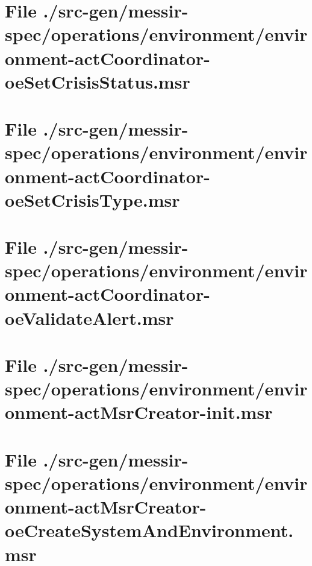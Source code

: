\section[File /src-gen/messir-spec.../environment-actCoordinator-oeSetCrisisStatus.msr]{File ./src-gen/messir-spec/operations/environment/environment-actCoordinator-oeSetCrisisStatus.msr}
\scriptsize

\normalsize
	
\section[File /src-gen/messir-spec.../environment-actCoordinator-oeSetCrisisType.msr]{File ./src-gen/messir-spec/operations/environment/environment-actCoordinator-oeSetCrisisType.msr}
\scriptsize

\normalsize
	
\section[File /src-gen/messir-spec.../environment-actCoordinator-oeValidateAlert.msr]{File ./src-gen/messir-spec/operations/environment/environment-actCoordinator-oeValidateAlert.msr}
\scriptsize

\normalsize
	
\section[File /src-gen/messir-spec/operations.../environment-actMsrCreator-init.msr]{File ./src-gen/messir-spec/operations/environment/environment-actMsrCreator-init.msr}
\scriptsize

\normalsize
	
\section[File /src-gen.../environment-actMsrCreator-oeCreateSystemAndEnvironment.msr]{File ./src-gen/messir-spec/operations/environment/environment-actMsrCreator-oeCreateSystemAndEnvironment.msr}
\scriptsize

\normalsize
	

